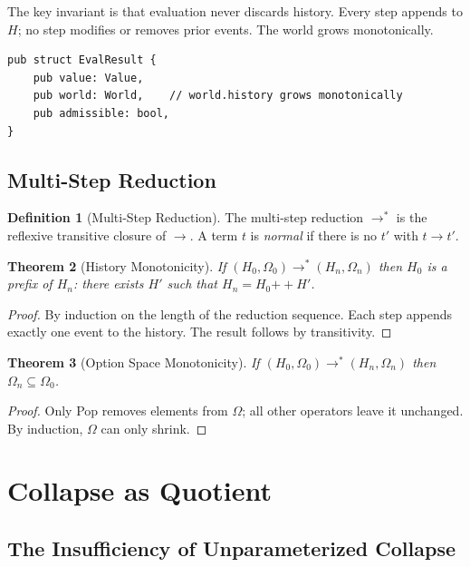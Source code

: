\documentclass[12pt, a4paper, openany]{book}
\theoremstyle{plain}
\newtheorem{theorem}{Theorem}[chapter]
\theoremstyle{definition}
\newtheorem{definition}[theorem]{Definition}
\theoremstyle{remark}
\begin{document}
The key invariant is that evaluation never discards history. Every step appends
to $H$; no step modifies or removes prior events. The world grows monotonically.

\begin{lstlisting}[style=rust, caption={Evaluation result preserving all history}]
pub struct EvalResult {
    pub value: Value,
    pub world: World,    // world.history grows monotonically
    pub admissible: bool,
}
\end{lstlisting}

\section{Multi-Step Reduction}

\begin{definition}[Multi-Step Reduction]
The multi-step reduction $\to^*$ is the reflexive transitive closure of $\to$.
A term $t$ is \emph{normal} if there is no $t'$ with $t \to t'$.
\end{definition}

\begin{theorem}[History Monotonicity]
If $(H_0, \Omega_0) \to^* (H_n, \Omega_n)$ then $H_0$ is a prefix of $H_n$:
there exists $H'$ such that $H_n = H_0 \mathbin{++} H'$.
\end{theorem}

\begin{proof}
By induction on the length of the reduction sequence. Each step appends exactly
one event to the history. The result follows by transitivity.
\end{proof}

\begin{theorem}[Option Space Monotonicity]
If $(H_0, \Omega_0) \to^* (H_n, \Omega_n)$ then $\Omega_n \subseteq \Omega_0$.
\end{theorem}

\begin{proof}
Only Pop removes elements from $\Omega$; all other operators leave it unchanged.
By induction, $\Omega$ can only shrink.
\end{proof}

\chapter{Collapse as Quotient}

\section{The Insufficiency of Unparameterized Collapse}
\end{document}
